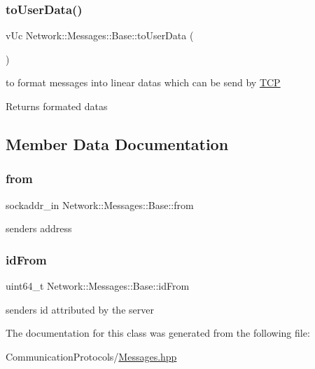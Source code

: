 \subsubsection{\texorpdfstring{to\+User\+Data()}{toUserData()}}
{\footnotesize\ttfamily v\+Uc Network\+::\+Messages\+::\+Base\+::to\+User\+Data (\begin{DoxyParamCaption}{ }\end{DoxyParamCaption})\hspace{0.3cm}{\ttfamily [inline]}}



to format messages into linear datas which can be send by \hyperlink{namespace_t_c_p}{T\+CP} 

\begin{DoxyReturn}{Returns}
formated datas 
\end{DoxyReturn}


\subsection{Member Data Documentation}
\mbox{\label{class_network_1_1_messages_1_1_base_a69cd114b95f2b08d2c1cc7e9e8b3e0d1}} 
\subsubsection{\texorpdfstring{from}{from}}
{\footnotesize\ttfamily sockaddr\+\_\+in Network\+::\+Messages\+::\+Base\+::from}

sender\textquotesingle{}s address \mbox{\label{class_network_1_1_messages_1_1_base_a8774bdd6b0cdd35e14379b903617643d}} 
\subsubsection{\texorpdfstring{id\+From}{idFrom}}
{\footnotesize\ttfamily uint64\+\_\+t Network\+::\+Messages\+::\+Base\+::id\+From}

sender\textquotesingle{}s id attributed by the server 

The documentation for this class was generated from the following file\+:\begin{DoxyCompactItemize}
\item 
Communication\+Protocols/\hyperlink{_messages_8hpp}{Messages.\+hpp}\end{DoxyCompactItemize}
